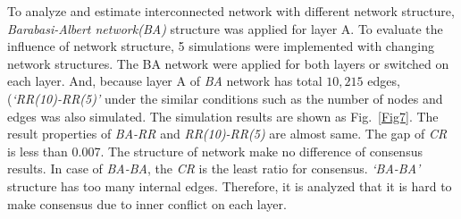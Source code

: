 \documentclass[english]{cccconf}
\begin{document}
To analyze and estimate interconnected network with different network structure, \textit{Barabasi-Albert network(BA)} structure was applied for layer A\cite{barabasi1999}. To evaluate the influence of network structure, 5 simulations were implemented with changing network structures. The BA network were applied for both layers or switched on each layer. And, because layer A of \textit{BA} network has total $10,215$ edges, (\textit{`RR(10)-RR(5)'} under the similar conditions such as the number of nodes and edges was also simulated. The simulation results are shown as Fig.~\ref{Fig7}. The result properties of \textit{BA-RR} and \textit{RR(10)-RR(5)} are almost same. The gap of \textit{CR} is less than 0.007. The structure of network make no difference of consensus results. In case of \textit{BA-BA}, the \textit{CR} is the least ratio for consensus. \textit{`BA-BA'} structure has too many internal edges. Therefore, it is analyzed that it is hard to make consensus due to inner conflict on each layer. 
\end{document}
